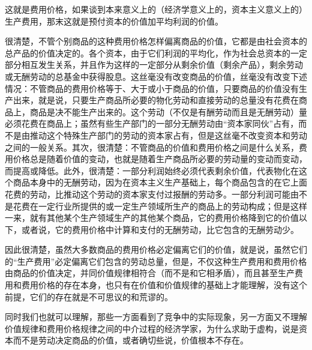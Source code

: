 这就是费用价格，如果谈到本来意义上的（经济学意义上的，资本主义意义上的）生产费用，那末这就是预付资本的价值加平均利润的价值。

很清楚，不管个别商品的这种费用价格怎样偏离商品的价值，它都是由社会资本的总产品的价值决定的。各个资本，由于它们利润的平均化，作为社会总资本的一定部分相互发生关系，并且作为这样的一定部分从剩余价值（剩余产品），剩余劳动或无酬劳动的总基金中获得股息。这丝毫没有改变商品的价值，丝毫没有改变下述情况：不管商品的费用价格等于、大于或小于商品的价值，只要商品的价值没有生产出来，就是说，只要生产商品所必要的物化劳动和直接劳动的总量没有花费在商品上，商品是决不能生产出来的。这个劳动（不仅是有酬劳动而且是无酬劳动）量必须花费在商品上；虽然有些生产部门的一部分无酬劳动由“资本家同伙”占有，而不是由推动这个特殊生产部门的劳动的资本家占有，但是这丝毫不改变资本和劳动之间的一般关系。其次，很清楚：不管商品的价值和费用价格之间是什么关系，费用价格总是随着价值的变动，也就是随着生产商品所必要的劳动量的变动而变动，而提高或降低。此外，很清楚：一部分利润始终必须代表剩余价值，代表物化在这个商品本身中的无酬劳动，因为在资本主义生产基础上，每个商品包含的在它上面花费的劳动，比推动这个劳动的资本家支付过报酬的劳动多。一部分利润可能由不是花费在一定行业所提供的或一定生产领域所生产的商品上的劳动构成；但是这样一来，就有其他某个生产领域生产的其他某个商品，它的费用价格降到它的价值以下，或者说，它的费用价格中计算和支付的无酬劳动，比它包含的无酬劳动少。

因此很清楚，虽然大多数商品的费用价格必定偏离它们的价值，就是说，虽然它们的“生产费用”必定偏离它们包含的劳动总量，但是，不仅这种生产费用和费用价格由商品的价值决定，并同价值规律相符合（而不是和它相矛盾），而且甚至生产费用和费用价格的存在本身，也只有在价值和价值规律的基础上才能理解，没有这个前提，它们的存在就是不可思议的和荒谬的。

同时我们也就可以理解，那些一方面看到了竞争中的实际现象，另一方面又不理解价值规律和费用价格规律之间的中介过程的经济学家，为什么求助于虚构，说是资本而不是劳动决定商品的价值，或者确切些说，价值根本不存在。

